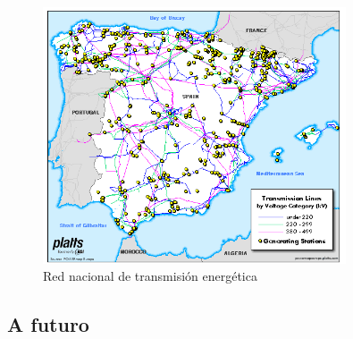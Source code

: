 \begin{figure}[h]
  \centering
  \includegraphics[width=0.8\textwidth]{img/teoria/spain.png}
  \caption{Red nacional de transmisión energética \cite{spain}}
  \label{fig:spain}
\end{figure}

\vspace{3mm}








\subsection{A futuro}


